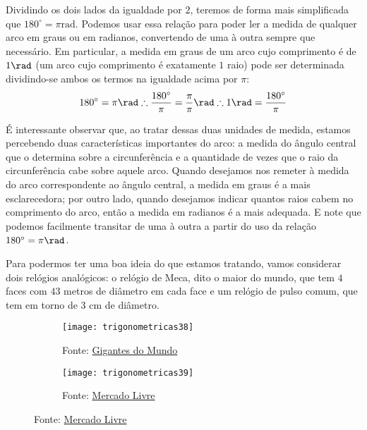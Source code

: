 Dividindo os dois lados da igualdade por $2$, teremos de forma mais simplificada que $180^{\circ}=\pi \mathrm{rad}$. Podemos usar essa relação para poder ler a medida de qualquer arco em graus ou em radianos, convertendo de uma à outra sempre que necessário. Em particular, a medida em graus de um arco cujo comprimento é de $1\rad$ (um arco cujo comprimento é exatamente $1$ raio) pode ser determinada dividindo-se ambos os termos na igualdade acima por $\pi$:
\begin{equation*}
180^{\circ}=\pi \rad\therefore\frac{180^{\circ}}{\pi}=\frac{\pi}{\pi} \rad\therefore1 \rad=\frac{180^{\circ}}{\pi}
\end{equation*}

\begin{observation}
É interessante observar que, ao tratar dessas duas unidades de medida, estamos percebendo duas características importantes do arco: a medida do ângulo central que o determina sobre a circunferência e a quantidade de vezes que o raio da circunferência cabe sobre aquele arco. Quando desejamos nos remeter à medida do arco correspondente ao ângulo central, a medida em graus é a mais esclarecedora; por outro lado, quando desejamos indicar quantos raios cabem no comprimento do arco, então a medida em radianos é a mais adequada. E note que podemos facilmente transitar de uma à outra a partir do uso da relação $180^{\circ}=\pi\rad$.
\end{observation}


Para podermos ter uma boa ideia do que estamos tratando, vamos considerar dois relógios analógicos: o relógio de Meca, dito o maior do mundo, que tem $4$ faces com $43$ metros de diâmetro em cada face e um relógio de pulso comum, que tem em torno de $3$ cm de diâmetro.

\begin{figure}[H]
\centering

\begin{minipage}{.45\linewidth}
\begin{figure}[H]
\centering

\texttt{[image: trigonometricas38]}
\caption{Fonte: \href{https://gigantesdomundo.blogspot.com/2012/11/o-maior-relogio-do-mundo.html}{Gigantes do Mundo}}

\end{figure}
\end{minipage}
\hspace{2em}
\begin{minipage}{.45\linewidth}
\begin{figure}[H]
\centering

\texttt{[image: trigonometricas39]}
\caption{Fonte: \href{https://produto.mercadolivre.com.br/MLB-1160291326-relogio-pulso-personalizado-com-foto-imagem-logo-promoco-_JM}{Mercado Livre}}

\end{figure}
\end{minipage}
\end{figure}

